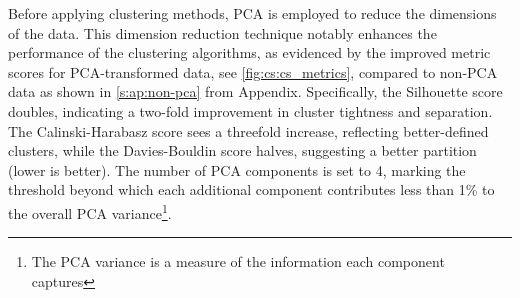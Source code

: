 Before applying clustering methods, \gls{PCA} is employed to reduce the dimensions of the data. This dimension reduction technique notably enhances the performance of the clustering algorithms, as evidenced by the improved metric scores for PCA-transformed data, see  \cref{fig:cs:cs_metrics}, compared to non-PCA data as shown in \cref{s:ap:non-pca} from Appendix. Specifically, the Silhouette score doubles, indicating a two-fold improvement in cluster tightness and separation. The Calinski-Harabasz score sees a threefold increase, reflecting better-defined clusters, while the Davies-Bouldin score halves, suggesting a better partition (lower is better). The number of PCA components is set to 4, marking the threshold beyond which each additional component contributes less than 1\% to the overall PCA variance\footnote{The PCA variance is a measure of the information each component captures}.

